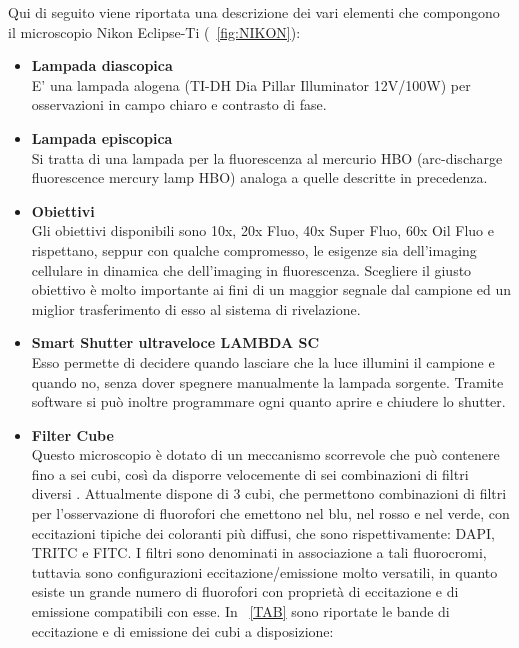 Qui di seguito viene riportata una descrizione dei vari elementi che compongono il microscopio Nikon Eclipse-Ti (\figurename~\ref{fig:NIKON}):

\begin{itemize}

\item \textbf{Lampada diascopica}\\
E' una lampada alogena (TI-DH Dia Pillar Illuminator 12V/100W) per osservazioni in campo chiaro e contrasto di fase.\\

\item \textbf{Lampada episcopica} \\
Si tratta di una lampada per la fluorescenza al mercurio HBO (arc-discharge fluorescence mercury lamp HBO) analoga a quelle descritte in precedenza.\\

\item \textbf{Obiettivi}\\
Gli obiettivi disponibili sono 10x, 20x Fluo, 40x Super Fluo, 60x Oil Fluo e rispettano, seppur con qualche compromesso, le esigenze sia dell'imaging cellulare in dinamica che dell'imaging in fluorescenza. Scegliere il giusto obiettivo è molto importante ai fini di un maggior segnale dal campione ed un miglior trasferimento di esso al sistema di rivelazione.\\

\item \textbf{Smart Shutter ultraveloce LAMBDA SC}\\
Esso permette di decidere quando lasciare che la luce illumini il campione e quando no, senza dover spegnere manualmente la lampada sorgente. Tramite software si può inoltre programmare ogni quanto aprire e chiudere lo shutter.\\

\item \textbf{Filter Cube}\\
Questo microscopio è dotato di un meccanismo scorrevole che può contenere fino a sei cubi, così da disporre velocemente di sei combinazioni di filtri diversi \cite{Nikon1}. Attualmente dispone di 3 cubi, che permettono combinazioni di filtri per l'osservazione di fluorofori che emettono nel blu, nel rosso e nel verde, con eccitazioni tipiche dei coloranti più diffusi, che sono rispettivamente: DAPI, TRITC e FITC. I filtri sono denominati in associazione a tali fluorocromi, tuttavia sono configurazioni eccitazione/emissione molto versatili, in quanto esiste un grande numero di fluorofori con proprietà di eccitazione e di emissione compatibili con esse. In \tablename~\ref{TAB} sono riportate le bande di eccitazione e di emissione dei cubi a disposizione:\\


\end{itemize}
